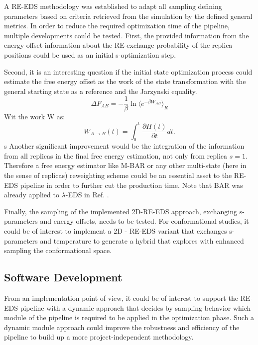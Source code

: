 A RE-EDS methodology was established to adapt all sampling defining parameters based on criteria retrieved from the simulation by the defined general metrics. 
In order to reduce the required optimization time of the pipeline, multiple developments could be tested. 
First, the provided information from the energy offset information about the RE exchange probability of the replica positions could be used as an initial s-optimization step. 

Second, it is an interesting question if the initial state optimization process could estimate the free energy offset as the work of the state transformation with the general starting state as a reference and the Jarzynski equality. \cite{Jarzynski1997,  Xiong2006} 
\begin{equation}
	\Delta F_{AB} = -\frac{1}{\beta} \ln\langle e^{-\beta W_{AB}} \rangle_R
\end{equation}
Wit the work W as: \cite{Xiong2006}
\begin{equation}
	W_{A \rightarrow B}(t)= \int_{0}^{t} \frac{\partial H(t)}{\partial t} dt .
\end{equation}
s
Another significant improvement would be the integration of the information from all replicas in the final free energy estimation, not only from replica $s=1$. 
Therefore a free energy estimator like M-BAR\cite{Shirts2008} or any other multi-state (here in the sense of replicas) reweighting scheme could be an essential asset to the RE-EDS pipeline in order to further cut the production time. Note that BAR\cite{Bennett1976} was already applied to $\lambda$-EDS in Ref. .

Finally, the sampling of the implemented 2D-RE-EDS approach, exchanging s-parameters and energy offsets, needs to be tested. For conformational studies, it could be of interest to implement a 2D - RE-EDS variant that exchanges s-parameters and temperature to generate a hybrid that explores with enhanced sampling the conformational space.

\subsection{Software Development}
From an implementation point of view, it could be of interest to support the RE-EDS pipeline \cite{Ries2021B} with a dynamic approach that decides by sampling behavior which module of the pipeline is required to be applied in the optimization phase. Such a dynamic module approach could improve the robustness and efficiency of the pipeline to build up a more project-independent methodology.

